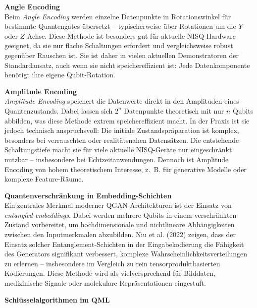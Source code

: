 \noindent
\textbf{Angle Encoding}\\
Beim \textit{Angle Encoding} werden einzelne Datenpunkte in Rotationswinkel für bestimmte Quantengates übersetzt – typischerweise über Rotationen um die $Y$- oder $Z$-Achse. Diese Methode ist besonders gut für aktuelle NISQ-Hardware geeignet, da sie nur flache Schaltungen erfordert und vergleichsweise robust gegenüber Rauschen ist. Sie ist daher in vielen aktuellen Demonstratoren der Standardansatz, auch wenn sie nicht speichereffizient ist: Jede Datenkomponente benötigt ihre eigene Qubit-Rotation. \cite{schuld_introduction_2015} \cite{bsiQuantumMachineLearning2025}

\vspace{0.2cm}
\noindent
\textbf{Amplitude Encoding}\\
\textit{Amplitude Encoding} speichert die Datenwerte direkt in den Amplituden eines Quantenzustands. Dabei lassen sich $2^n$ Datenpunkte theoretisch mit nur $n$ Qubits abbilden, was diese Methode extrem speichereffizient macht. In der Praxis ist sie jedoch technisch anspruchsvoll: Die initiale Zustandspräparation ist komplex, besonders bei verrauschten oder realitätsnahen Datensätzen. Die entstehende Schaltungstiefe macht sie für viele aktuelle NISQ-Geräte nur eingeschränkt nutzbar – insbesondere bei Echtzeitanwendungen. Dennoch ist Amplitude Encoding von hohem theoretischem Interesse, z.~B. für generative Modelle oder komplexe Feature-Räume. \cite{schuld_introduction_2015} \cite{zoufal_quantum_2019}

\vspace{0.2cm}
\noindent
\textbf{Quantenverschränkung in Embedding-Schichten}\\
Ein zentrales Merkmal moderner QGAN-Architekturen ist der Einsatz von \textit{entangled embeddings}. Dabei werden mehrere Qubits in einem verschränkten Zustand vorbereitet, um hochdimensionale und nichtlineare Abhängigkeiten zwischen den Inputmerkmalen abzubilden. Niu et al. (2022) zeigen, dass der Einsatz solcher Entanglement-Schichten in der Eingabekodierung die Fähigkeit des Generators signifikant verbessert, komplexe Wahrscheinlichkeitsverteilungen zu erlernen – insbesondere im Vergleich zu rein tensorproduktbasierten Kodierungen. Diese Methode wird als vielversprechend für Bilddaten, medizinische Signale oder molekulare Repräsentationen eingestuft. \cite{niu_entangling_2022}

\vspace{0.5cm}

\noindent\textbf{Schlüsselalgorithmen im QML}  

